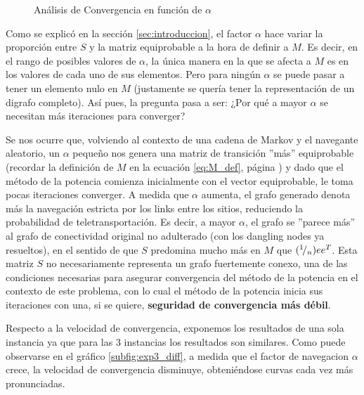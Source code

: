 \begin{figure}[H]
    \centering
    \caption{An\'alisis de Convergencia en funci\'on de $\alpha$}
\end{figure}

\par Como se explic\'o en la secci\'on \ref{sec:introduccion}, el factor
$\alpha$ hace variar la proporci\'on entre $S$ y la matriz equiprobable a la
hora de definir a $M$. Es decir, en el rango de posibles valores de $\alpha$, la
\'unica manera en la que se afecta a $M$ es en los valores de cada uno de sus
elementos. Pero para ning\'un $\alpha$ se puede pasar a tener un elemento nulo
en $M$ (justamente se quer\'ia tener la representaci\'on de un digrafo
completo). As\'i pues, la pregunta pasa a ser: ¿Por qu\'e a mayor $\alpha$ se
necesitan m\'as iteraciones para converger?

\par Se nos ocurre que, volviendo al contexto de una cadena de Markov y el
navegante aleatorio, un $\alpha$ peque\~no nos genera una matriz de transici\'on
''m\'as'' equiprobable (recordar la definici\'on de $M$ en la ecuaci\'on
\ref{eq:M_def}, p\'agina \pageref{eq:M_def}) y dado que el método de la potencia
comienza inicialmente con el vector equiprobable, le toma pocas iteraciones
converger. A medida que $\alpha$ aumenta, el grafo generado denota más la
navegación estricta por los links entre los sitios, reduciendo la probabilidad
de teletransportación. Es decir, a mayor $\alpha$, el grafo se ''parece m\'as''
al grafo de conectividad original no adulterado (con los dangling nodes ya
resueltos), en el sentido de que $S$ predomina mucho m\'as en $M$ que
$({}^{1}\!/_{n})ee^T$. Esta matriz $S$ no necesariamente representa un grafo
fuertemente conexo, una de las condiciones necesarias para asegurar convergencia
del método de la potencia en el contexto de este problema, con lo cual el método
de la potencia inicia sus iteraciones con una, si se quiere, \textbf{seguridad
de convergencia más débil}.

\par Respecto a la velocidad de convergencia, exponemos los resultados de una
sola instancia ya que para las 3 instancias los resultados son similares. Como
puede observarse en el gráfico \ref{subfig:exp3_diff}, a medida que el factor de
navegacion $\alpha$ crece, la velocidad de convergencia disminuye,
obteni\'endose curvas cada vez m\'as pronunciadas.


